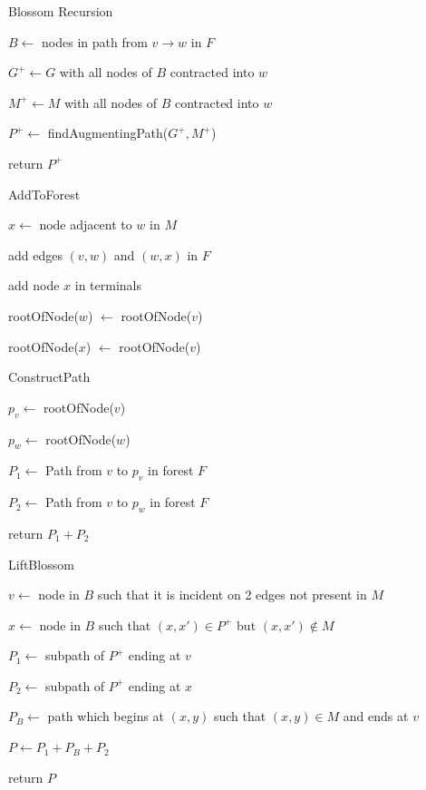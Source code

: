 \documentclass{article}
\begin{document}
\begin{algorithm}[!h]
\caption{Blossom Recursion}

$B \leftarrow$ nodes in path from $v \to w$ in $F$

$G^+ \leftarrow G$ with all nodes of $B$ contracted into $w$

$M^+ \leftarrow M$ with all nodes of $B$ contracted into $w$

$P^+ \leftarrow$ findAugmentingPath($G^+, M^+$)


return $P^+$
\end{algorithm}

\begin{algorithm}[!h]
\caption{AddToForest}

$x \leftarrow$ node adjacent to $w$ in $M$

add edges $(v, w)$ and $(w, x)$ in $F$

add node $x$ in terminals

rootOfNode($w$) $\leftarrow$ rootOfNode($v$)

rootOfNode($x$) $\leftarrow$ rootOfNode($v$)
\end{algorithm}

\begin{algorithm}[H]
\caption{ConstructPath}

$p_v \leftarrow$ rootOfNode($v$)

$p_w \leftarrow$ rootOfNode($w$)

$P_1 \leftarrow$ Path from $v$ to $p_v$ in forest $F$

$P_2 \leftarrow$ Path from $v$ to $p_w$ in forest $F$

return $P_1 + P_2$
\end{algorithm}

\begin{algorithm}[!h]
\caption{LiftBlossom}
$v \leftarrow$ node in $B$ such that it is incident on 2 edges not present in $M$

$x \leftarrow$ node in $B$ such that $(x, x') \in P^+$ but $(x, x') \notin M$


$P_1 \leftarrow$ subpath of $P^+$ ending at $v$

$P_2 \leftarrow$ subpath of $P^+$ ending at $x$

$P_B \leftarrow$ path which begins at $(x, y)$ such that $(x, y) \in M$ and ends at $v$

$P \leftarrow P_1 + P_B + P_2$

return $P$
\end{algorithm}
\end{document}
